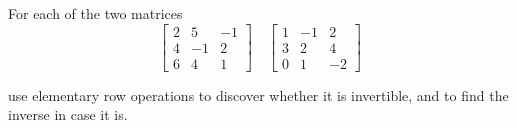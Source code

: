 \begin{exercise}
    For each of the two matrices
    \[
        \begin{bmatrix}
            2 & 5  & -1 \\
            4 & -1 & 2  \\
            6 & 4  & 1
        \end{bmatrix}
        \quad
        \begin{bmatrix}
            1 & -1 & 2  \\
            3 & 2  & 4  \\
            0 & 1  & -2
        \end{bmatrix}
    \]

    use elementary row operations to discover whether it is invertible, and to find the inverse in case it is.
\end{exercise}

